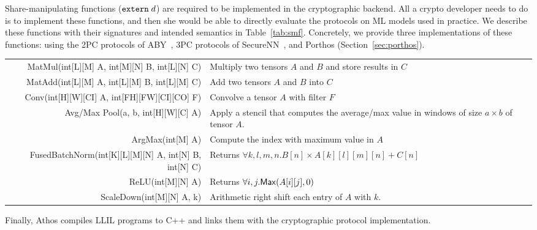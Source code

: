 Share-manipulating functions (${\mathtt{extern}}\;d$) are required to be
implemented in the cryptographic backend.
All a crypto developer needs to do is to implement these functions,
and then she would be able to directly evaluate
the protocols on ML models used in practice. We describe these
functions with their signatures and intended semantics in Table~\ref{tab:smf}.
Concretely, we provide three implementations of these functions: using the 2PC
protocols of ABY~\cite{aby}, 3PC protocols of SecureNN~\cite{securenn},
and Porthos (Section~\ref{sec:porthos}). 

\begin{table*}
\begin{tabular}{rl}
MatMul(int[L][M] A, int[M][N] B, int[L][N] C) & Multiply two tensors $A$ and $B$ and store results in $C$\\
MatAdd(int[L][M] A, int[L][M] B, int[L][M] C)& Add two tensors $A$ and $B$ into $C$\\
Conv(int[H][W][CI] A,  int[FH][FW][CI][CO] F) & Convolve a tensor $A$ with filter $F$\\
Avg/Max Pool(a, b, int[H][W][C] A) & Apply a stencil that computes the average/max value in windows of size $a\times b$ of tensor $A$.\\
ArgMax(int[M] A) & Compute the index with maximum value in $A$ \\
FusedBatchNorm(int[K][L][M][N] A, int[N] B, int[N] C) & Returns $\forall k,l,m,n. B[n] \times A[k][l][m][n] + C[n]$\\
ReLU(int[M][N] A) & Returns $\forall i,j. {\sf Max}(A[i][j],0)$\\
ScaleDown(int[M][N] A, k) & Arithmetic right shift each entry of $A$ with $k$.\\
\end{tabular}
\caption{Share manipulating functions. These have been simplified for
  exposition by suppressing parameters such as padding and
  strides. For comprehensive signatures, see~\url{https://www.tensorflow.org/api_docs/python/tf/}.}
\label{tab:smf}
\end{table*} 


Finally, Athos compiles LLIL programs to C++ and links them with
the cryptographic \mpc protocol implementation.

